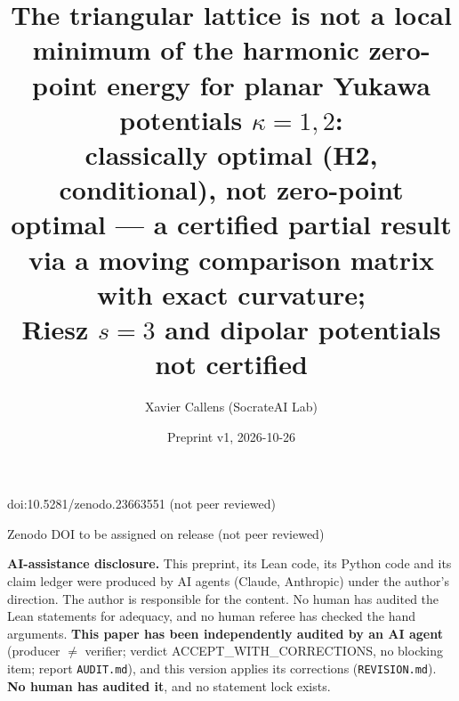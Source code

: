 \documentclass[10pt]{article}
\title{The triangular lattice is not a local minimum of the harmonic zero-point energy for planar Yukawa potentials $\kappa=1,2$:\\
classically optimal (H2, conditional), not zero-point optimal --- a certified partial result via a moving comparison matrix with exact curvature;\\
Riesz $s=3$ and dipolar potentials not certified}
\author{Xavier Callens (SocrateAI Lab)}
\date{Preprint v1, 2026-10-26}
\begin{document}
\maketitle
\begin{center}\small doi:10.5281/zenodo.23663551 \quad (not peer reviewed)\end{center}

\begin{center}\small Zenodo DOI to be assigned on release \quad (not peer reviewed)\end{center}

\noindent\textbf{AI-assistance disclosure.} This preprint, its Lean code, its Python code and its claim ledger were
produced by AI agents (Claude, Anthropic) under the author's direction. The author is responsible for the content. No human
has audited the Lean statements for adequacy, and no human referee has checked the hand arguments. \textbf{This paper has been independently audited by an AI agent} (producer $\neq$ verifier; verdict ACCEPT\_WITH\_CORRECTIONS, no blocking item; report \texttt{AUDIT.md}), and this version applies its corrections (\texttt{REVISION.md}). \textbf{No human has audited it}, and no statement lock exists.
\end{document}

